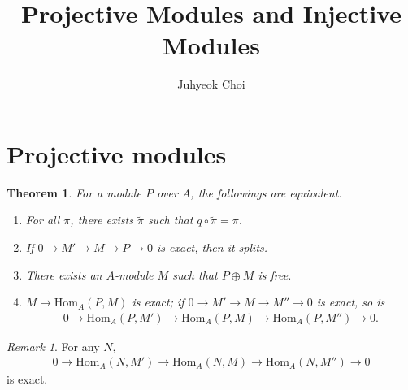 \documentclass[12pt]{article}
\theoremstyle{plain}
\newtheorem{theorem}{Theorem}[section]
\theoremstyle{remark}
\newtheorem*{remark}{Remark}
\theoremstyle{definition}
\newcommand{\Hom}[3]{\mathrm{Hom}_{#3}(#1,#2)}
\begin{document}
\title{Projective Modules and Injective Modules}
\author{Juhyeok Choi}
\date{}

\maketitle


\section{Projective modules}
\begin{theorem}\label{Theorem 2.6.1.}
    For a module $P$ over $A$, the followings are equivalent.
    \begin{enumerate}
        \item For all $\pi$, there exists $\tilde{\pi}$ such that $q\circ \tilde{\pi} = \pi$.
        \begin{figure}[H]
            \centering
        \end{figure}
        \item If $0\rightarrow M'\rightarrow M\rightarrow P\rightarrow 0$ is exact, then it splits.
        \begin{figure}[H]
            \centering
        \end{figure}
        \item There exists an $A$-module $M$ such that $P\oplus M$ is free.
        \item $M\mapsto \Hom{P}{M}{A}$ is exact; if $0\rightarrow M'\rightarrow M\rightarrow M''\rightarrow 0$ is exact, so is
        \begin{align*}
            0\rightarrow \Hom{P}{M'}{A}\rightarrow \Hom{P}{M}{A}\rightarrow \Hom{P}{M''}{A}\rightarrow 0.
        \end{align*}
    \end{enumerate}
\end{theorem}
\begin{remark}
    For any $N$,
    \begin{align*}
        0\rightarrow \Hom{N}{M'}{A}\rightarrow \Hom{N}{M}{A}\rightarrow \Hom{N}{M''}{A}\rightarrow 0
    \end{align*}
    is exact.
\end{remark}
\end{document}
